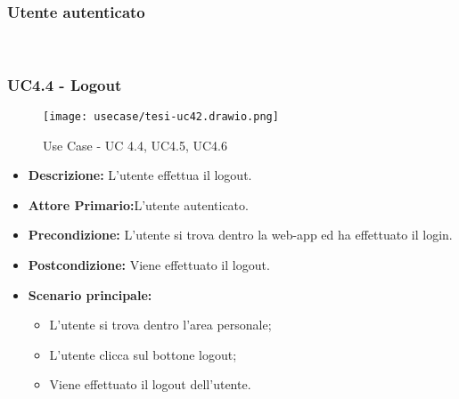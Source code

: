 \subsubsection{Utente autenticato}\\
\subsubsection{UC4.4 - Logout}
\begin{figure}[H]
    \centering
    \texttt{[image: usecase/tesi-uc42.drawio.png]}
    \caption{Use Case - UC 4.4, UC4.5, UC4.6}
\end{figure}
\begin{itemize}
    \item \textbf{Descrizione:} L'utente effettua il logout.
    \item \textbf{Attore Primario:}L'utente autenticato.
    \item \textbf{Precondizione:} L'utente si trova dentro la web-app ed ha effettuato il login.
    \item \textbf{Postcondizione:} Viene effettuato il logout.
    \item \textbf{Scenario principale:}
    \begin{itemize}
        \item L'utente si trova dentro l'area personale;
        \item L'utente clicca sul bottone logout;
        \item Viene effettuato il logout dell'utente.
    \end{itemize}
\end{itemize}
